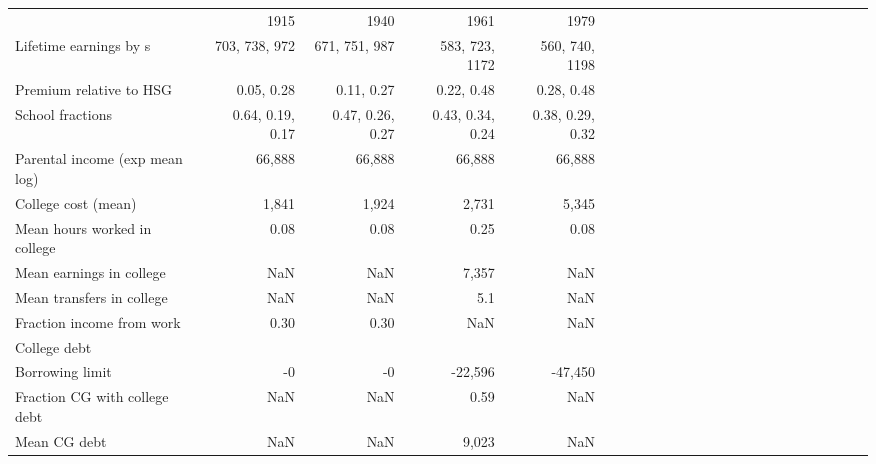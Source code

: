 \begin{tabular}{lrrrrrrrrrrrrrrrrrrrrrrr}
\hline
 & 1915  & 1940  & 1961  & 1979  &   &   &   &   &   &   &   &   &   &   &   &   &   &   &   &   &   &   &   \\
Lifetime earnings by s & 703, 738, 972  & 671, 751, 987  & 583, 723, 1172  & 560, 740, 1198  &   &   &   &   &   &   &   &   &   &   &   &   &   &   &   &   &   &   &   \\
Premium relative to HSG & 0.05, 0.28  & 0.11, 0.27  & 0.22, 0.48  & 0.28, 0.48  &   &   &   &   &   &   &   &   &   &   &   &   &   &   &   &   &   &   &   \\
School fractions & 0.64, 0.19, 0.17  & 0.47, 0.26, 0.27  & 0.43, 0.34, 0.24  & 0.38, 0.29, 0.32  &   &   &   &   &   &   &   &   &   &   &   &   &   &   &   &   &   &   &   \\
Parental income (exp mean log) & 66,888  & 66,888  & 66,888  & 66,888  &   &   &   &   &   &   &   &   &   &   &   &   &   &   &   &   &   &   &   \\
College cost (mean) & 1,841  & 1,924  & 2,731  & 5,345  &   &   &   &   &   &   &   &   &   &   &   &   &   &   &   &   &   &   &   \\
Mean hours worked in college & 0.08  & 0.08  & 0.25  & 0.08  &   &   &   &   &   &   &   &   &   &   &   &   &   &   &   &   &   &   &   \\
Mean earnings in college & NaN  & NaN  & 7,357  & NaN  &   &   &   &   &   &   &   &   &   &   &   &   &   &   &   &   &   &   &   \\
Mean transfers in college & NaN  & NaN  & 5.1  & NaN  &   &   &   &   &   &   &   &   &   &   &   &   &   &   &   &   &   &   &   \\
Fraction income from work & 0.30  & 0.30  & NaN  & NaN  &   &   &   &   &   &   &   &   &   &   &   &   &   &   &   &   &   &   &   \\
College debt &   &   &   &   &   &   &   &   &   &   &   &   &   &   &   &   &   &   &   &   &   &   &   \\
Borrowing limit & -0  & -0  & -22,596  & -47,450  &   &   &   &   &   &   &   &   &   &   &   &   &   &   &   &   &   &   &   \\
Fraction CG with college debt & NaN  & NaN  & 0.59  & NaN  &   &   &   &   &   &   &   &   &   &   &   &   &   &   &   &   &   &   &   \\
Mean CG debt & NaN  & NaN  & 9,023  & NaN  &   &   &   &   &   &   &   &   &   &   &   &   &   &   &   &   &   &   &   \\
\hline
\end{tabular}%
